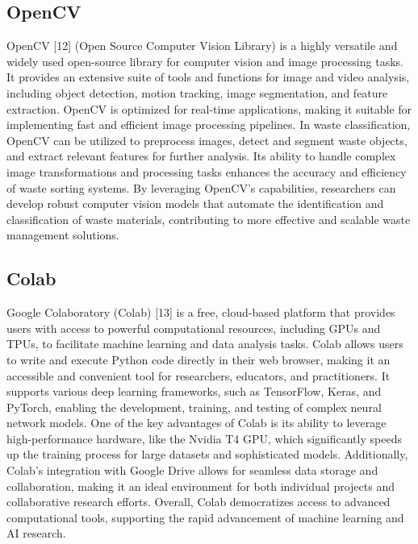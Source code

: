 \subsection{OpenCV}
OpenCV [12] (Open Source Computer Vision Library) is a highly versatile and widely used open-source library for computer vision and image processing tasks. It provides an extensive suite of tools and functions for image and video analysis, including object detection, motion tracking, image segmentation, and feature extraction. OpenCV is optimized for real-time applications, making it suitable for implementing fast and efficient image processing pipelines. In waste classification, OpenCV can be utilized to preprocess images, detect and segment waste objects, and extract relevant features for further analysis. Its ability to handle complex image transformations and processing tasks enhances the accuracy and efficiency of waste sorting systems. By leveraging OpenCV's capabilities, researchers can develop robust computer vision models that automate the identification and classification of waste materials, contributing to more effective and scalable waste management solutions.

\subsection{Colab}
Google Colaboratory (Colab) [13] is a free, cloud-based platform that provides users with access to powerful computational resources, including GPUs and TPUs, to facilitate machine learning and data analysis tasks. Colab allows users to write and execute Python code directly in their web browser, making it an accessible and convenient tool for researchers, educators, and practitioners. It supports various deep learning frameworks, such as TensorFlow, Keras, and PyTorch, enabling the development, training, and testing of complex neural network models. One of the key advantages of Colab is its ability to leverage high-performance hardware, like the Nvidia T4 GPU, which significantly speeds up the training process for large datasets and sophisticated models. Additionally, Colab's integration with Google Drive allows for seamless data storage and collaboration, making it an ideal environment for both individual projects and collaborative research efforts. Overall, Colab democratizes access to advanced computational tools, supporting the rapid advancement of machine learning and AI research.


